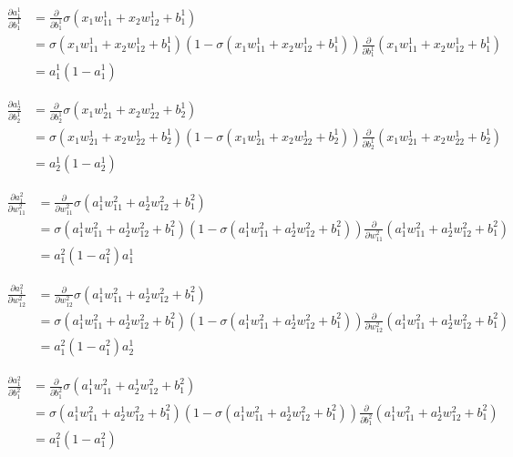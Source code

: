 \documentclass{article}
\begin{document}
\begin{align*}
\frac{\partial a^1_1}{\partial b^1_1} &= \frac{\partial}{\partial b^1_1} \sigma(x_1 w^1_{11} + x_2 w^1_{12} + b^1_1)\\
&= \sigma(x_1 w^1_{11} + x_2 w^1_{12} + b^1_1)(1 - \sigma(x_1 w^1_{11} + x_2 w^1_{12} + b^1_1)) \frac{\partial}{\partial b^1_1} (x_1 w^1_{11} + x_2 w^1_{12} + b^1_1)\\
&= a^1_1(1 - a^1_1)
\end{align*}

\begin{align*}
\frac{\partial a^1_2}{\partial b^1_2} &= \frac{\partial}{\partial b^1_2} \sigma(x_1 w^1_{21} + x_2 w^1_{22} + b^1_2)\\
&= \sigma(x_1 w^1_{21} + x_2 w^1_{22} + b^1_2)(1 - \sigma(x_1 w^1_{21} + x_2 w^1_{22} + b^1_2)) \frac{\partial}{\partial b^1_2} (x_1 w^1_{21} + x_2 w^1_{22} + b^1_2)\\
&= a^1_2(1 - a^1_2)
\end{align*}

\begin{align*}
\frac{\partial a^2_1}{\partial w^2_{11}} &= \frac{\partial}{\partial w^2_{11}} \sigma(a^1_1 w^2_{11} + a^1_2 w^2_{12} + b^2_1)\\
&= \sigma(a^1_1 w^2_{11} + a^1_2 w^2_{12} + b^2_1)(1 - \sigma(a^1_1 w^2_{11} + a^1_2 w^2_{12} + b^2_1)) \frac{\partial}{\partial w^2_{11}} (a^1_1 w^2_{11} + a^1_2 w^2_{12} + b^2_1)\\
&= a^2_1(1 - a^2_1)a^1_1
\end{align*}

\begin{align*}
\frac{\partial a^2_1}{\partial w^2_{12}} &= \frac{\partial}{\partial w^2_{12}} \sigma(a^1_1 w^2_{11} + a^1_2 w^2_{12} + b^2_1)\\
&= \sigma(a^1_1 w^2_{11} + a^1_2 w^2_{12} + b^2_1)(1 - \sigma(a^1_1 w^2_{11} + a^1_2 w^2_{12} + b^2_1)) \frac{\partial}{\partial w^2_{12}} (a^1_1 w^2_{11} + a^1_2 w^2_{12} + b^2_1)\\
&= a^2_1(1 - a^2_1)a^1_2
\end{align*}

\begin{align*}
\frac{\partial a^2_1}{\partial b^2_{1}} &= \frac{\partial}{\partial b^2_{1}} \sigma(a^1_1 w^2_{11} + a^1_2 w^2_{12} + b^2_1)\\
&= \sigma(a^1_1 w^2_{11} + a^1_2 w^2_{12} + b^2_1)(1 - \sigma(a^1_1 w^2_{11} + a^1_2 w^2_{12} + b^2_1)) \frac{\partial}{\partial b^2_{1}} (a^1_1 w^2_{11} + a^1_2 w^2_{12} + b^2_1)\\
&= a^2_1(1 - a^2_1)
\end{align*}
\end{document}
